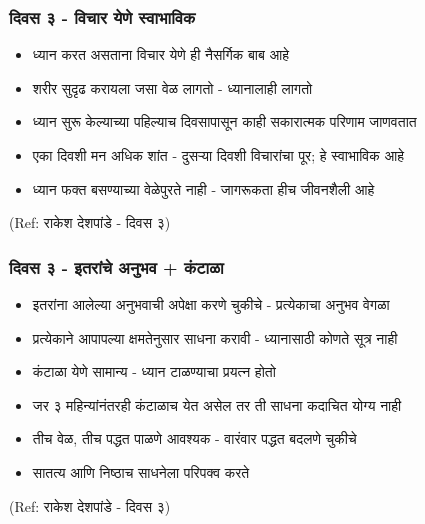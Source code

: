 \begin{frame}[fragile]\frametitle{दिवस ३ - विचार येणे स्वाभाविक}

	\begin{itemize}
	\item ध्यान करत असताना विचार येणे ही नैसर्गिक बाब आहे
	\item शरीर सुदृढ करायला जसा वेळ लागतो - ध्यानालाही लागतो
	\item ध्यान सुरू केल्याच्या पहिल्याच दिवसापासून काही सकारात्मक परिणाम जाणवतात
	\item एका दिवशी मन अधिक शांत - दुसऱ्या दिवशी विचारांचा पूर; हे स्वाभाविक आहे
	\item ध्यान फक्त बसण्याच्या वेळेपुरते नाही - जागरूकता हीच जीवनशैली आहे
	\end{itemize}

{\tiny (Ref: राकेश देशपांडे - दिवस ३)}

\end{frame}

\begin{frame}[fragile]\frametitle{दिवस ३ - इतरांचे अनुभव + कंटाळा}

	\begin{itemize}
	\item इतरांना आलेल्या अनुभवाची अपेक्षा करणे चुकीचे - प्रत्येकाचा अनुभव वेगळा
	\item प्रत्येकाने आपापल्या क्षमतेनुसार साधना करावी - ध्यानासाठी कोणते सूत्र नाही
	\item कंटाळा येणे सामान्य - ध्यान टाळण्याचा प्रयत्न होतो
	\item जर ३ महिन्यांनंतरही कंटाळाच येत असेल तर ती साधना कदाचित योग्य नाही
	\item तीच वेळ, तीच पद्धत पाळणे आवश्यक - वारंवार पद्धत बदलणे चुकीचे
	\item सातत्य आणि निष्ठाच साधनेला परिपक्व करते
	\end{itemize}

{\tiny (Ref: राकेश देशपांडे - दिवस ३)}

\end{frame}

